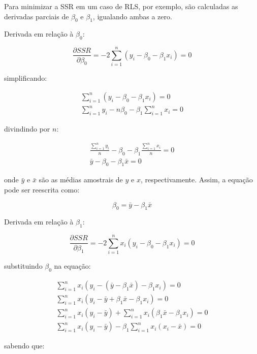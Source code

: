 Para minimizar a SSR em um caso de RLS, por exemplo, são calculadas as derivadas parciais de $\beta_0$ e $\beta_1$, igualando ambas a zero.

Derivada em relação à $\beta_0$:

\begin{equation}
	\frac{\partial SSR}{\partial \beta_0} = -2 \sum_{i=1}^n (y_i - \beta_0 - \beta_1 x_i) = 0
\end{equation}

simplificando:

\begin{gather*}
	\sum_{i=1}^n (y_i - \beta_0 - \beta_1 x_i) = 0 \\
	\sum_{i=1}^n y_i - n \beta_0 - \beta_1 \sum_{i=1}^n x_i = 0
\end{gather*}

divindindo por $n$:

\begin{gather*}
	\frac{\sum_{i=1}^n y_i}{n} - \beta_0 - \beta_1 \frac{\sum_{i=1}^n x_i}{n} = 0 \\
	\bar{y} - \beta_0 - \beta_1 \bar{x} = 0
\end{gather*}

onde $\bar{y}$ e $\bar{x}$ são as médias amostrais de $y$ e $x$, respectivamente. Assim, a equação pode ser reescrita como:

\begin{equation}
	\beta_0 = \bar{y} - \beta_1 \bar{x}
	\label{eq:beta0}
\end{equation}

Derivada em relação à $\beta_1$:

\begin{equation}
	\frac{\partial SSR}{\partial \beta_1} = -2 \sum_{i=1}^n x_i (y_i - \beta_0 - \beta_1 x_i) = 0
\end{equation}

substituindo $\beta_0$ na equação:


\begin{gather*}
	\sum_{i=1}^n x_i (y_i - (\bar{y} - \beta_1 \bar{x}) - \beta_1 x_i) = 0 \\
	\sum_{i=1}^n x_i (y_i - \bar{y} + \beta_1 \bar{x} - \beta_1 x_i) = 0 \\
	\sum_{i=1}^n x_i (y_i - \bar{y}) + \sum_{i=1}^n x_i (\beta_1 \bar{x} - \beta_1 x_i) = 0 \\
	\sum_{i=1}^n x_i (y_i - \bar{y}) - \beta_1 \sum_{i=1}^n x_i (x_i - \bar{x}) = 0
\end{gather*}

sabendo que:


